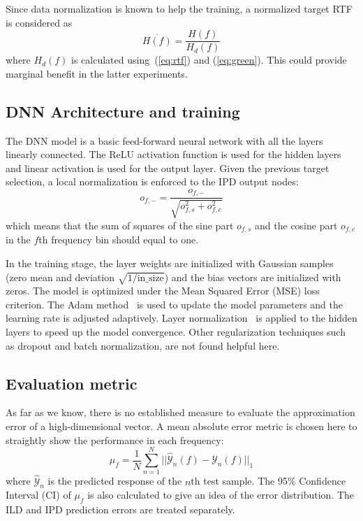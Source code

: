 \documentclass[journal]{IEEEtran}
\begin{document}
Since data normalization is known to help the training, a normalized target RTF is considered as
\begin{equation}\label{eq:dn}
  \overline{H(f)}=\frac{H(f)}{H_d(f)}
\end{equation}
where $H_d(f)$ is calculated using~(\ref{eq:rtf}) and (\ref{eq:green}). This could provide marginal benefit in the latter experiments.


\subsection{DNN Architecture and training}

The DNN model is a basic feed-forward neural network with all the layers linearly connected. The ReLU activation function is used for the hidden layers and linear activation is used for the output layer. Given the previous target selection, a local normalization is enforced to the IPD output nodes:
\begin{equation}\label{eq:ln}
  o_{f,-}=\frac{o_{f,-}}{\sqrt{o_{f,s}^2+o_{f,c}^2}}
\end{equation}
which means that the sum of squares of the sine part $o_{f,s}$ and the cosine part $o_{f,c}$ in the $f$th frequency bin should equal to one.

In the training stage, the layer weights are initialized with Gaussian samples (zero mean and deviation $\sqrt{1/\text{in\_size}}$) and the bias vectors are initialized with zeros. The model is optimized under the Mean Squared Error (MSE) loss criterion. The Adam method~\cite{kingma2014adam} is used to update the model parameters and the learning rate is adjusted adaptively. Layer normalization~\cite{ba2016layer} is applied to the hidden layers to speed up the model convergence. Other regularization techniques such as dropout and batch normalization, are not found helpful here.

\subsection{Evaluation metric}

As far as we know, there is no established measure to evaluate the approximation error of a high-dimensional vector. A mean absolute error metric is chosen here to straightly show the performance in each frequency:
\begin{equation}\label{eq:err}
  \mu_f = \frac{1}{N}\sum_{n=1}^{N}||\widehat{\mathcal{Y}}_n(f)-\mathcal{Y}_n(f)||_1
\end{equation}
where $\widehat{\mathcal{Y}}_n$ is the predicted response of the $n$th test sample. The 95\% Confidence Interval (CI) of $\mu_f$ is also calculated to give an idea of the error distribution. The ILD and IPD prediction errors are treated separately.
\end{document}
